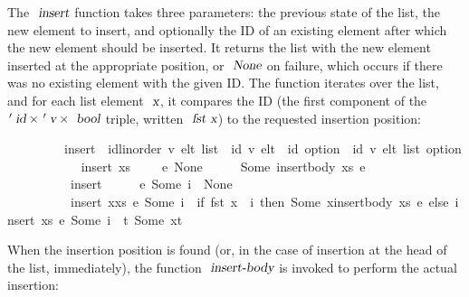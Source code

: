 The $\isa{insert}$ function takes three parameters: the previous state of the list, the new element to insert, and optionally the ID of an existing element after which the new element should be inserted.
It returns the list with the new element inserted at the appropriate position, or $\isa{None}$ on failure, which occurs if there was no existing element with the given ID.
The function iterates over the list, and for each list element $\isa{x}$, it compares the ID (the first component of the $\isacharprime\isa{id} \mathbin{\isasymtimes} \isacharprime\isa{v} \mathbin{\isasymtimes} \isa{bool}$ triple, written $\isa{fst x}$) to the requested insertion position:
\vspace{0.35em}
\begin{isabellebody}
\ \ \ \ \ \ \ \ \ insert\ {\isacharcolon}{\isacharcolon}\ {\isachardoublequoteopen}{\isacharparenleft}{\isacharprime}id{\isacharcolon}{\isacharcolon}{\isacharbraceleft}linorder{\isacharbraceright}{\isacharcomma}\ {\isacharprime}v{\isacharparenright}\ elt\ list\ {\isasymRightarrow}\ {\isacharparenleft}{\isacharprime}id{\isacharcomma}\ {\isacharprime}v{\isacharparenright}\ elt\ {\isasymRightarrow}\ {\isacharprime}id\ option\ {\isasymRightarrow}\ {\isacharparenleft}{\isacharprime}id{\isacharcomma}\ {\isacharprime}v{\isacharparenright}\ elt\ list\ option{\isachardoublequoteclose}\ \isanewline
\ \ \ \ \ \ \ \ \ \ {\isachardoublequoteopen}insert\ xs\ \ \ \ \ e\ None\ \ \ \ \ {\isacharequal}\ Some\ {\isacharparenleft}insert{\isacharunderscore}body\ xs\ e{\isacharparenright}{\isachardoublequoteclose}\ {\isacharbar}\isanewline
\ \ \ \ \ \ \ \ \ \ {\isachardoublequoteopen}insert\ {\isacharbrackleft}{\isacharbrackright}\ \ \ \ \ e\ {\isacharparenleft}Some\ i{\isacharparenright}\ {\isacharequal}\ None{\isachardoublequoteclose}\ {\isacharbar}\isanewline
\ \ \ \ \ \ \ \ \ \ {\isachardoublequoteopen}insert\ {\isacharparenleft}x{\isacharhash}xs{\isacharparenright}\ e\ {\isacharparenleft}Some\ i{\isacharparenright}\ {\isacharequal}\ {\isacharparenleft}if\ fst\ x\ {\isacharequal}\ i\ then\ Some\ {\isacharparenleft}x{\isacharhash}insert{\isacharunderscore}body\ xs\ e{\isacharparenright}\ else\ insert\ xs\ e\ {\isacharparenleft}Some\ i{\isacharparenright}\ {\isasymbind}\ {\isacharparenleft}{\isasymlambda}t{\isachardot}\ Some\ {\isacharparenleft}x{\isacharhash}t{\isacharparenright}{\isacharparenright}{\isacharparenright}{\isachardoublequoteclose}
\end{isabellebody}
\vspace{0.35em}
When the insertion position is found (or, in the case of insertion at the head of the list, immediately), the function $\isa{insert-body}$ is invoked to perform the actual insertion:
